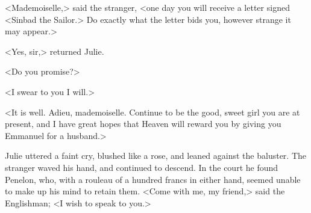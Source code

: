  <Mademoiselle,> said the stranger, <one day you will receive a letter signed <Sinbad the Sailor.> Do exactly what the letter bids you, however strange it may appear.> 

 <Yes, sir,> returned Julie. 

 <Do you promise?> 

 <I swear to you I will.> 

 <It is well. Adieu, mademoiselle. Continue to be the good, sweet girl you are at present, and I have great hopes that Heaven will reward you by giving you Emmanuel for a husband.> 

 Julie uttered a faint cry, blushed like a rose, and leaned against the baluster. The stranger waved his hand, and continued to descend. In the court he found Penelon, who, with a rouleau of a hundred francs in either hand, seemed unable to make up his mind to retain them. <Come with me, my friend,> said the Englishman; <I wish to speak to you.> 